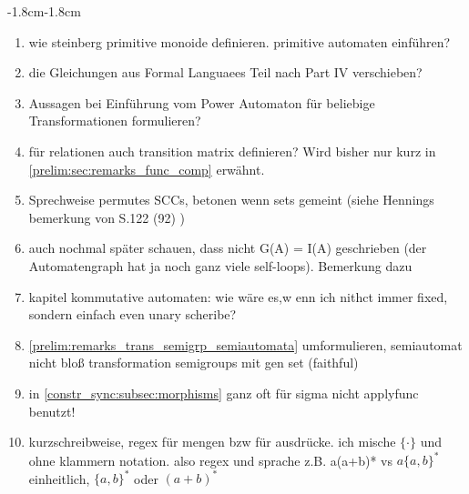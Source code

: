 \begin{adjustwidth}{-1.8cm}{-1.8cm}
\begin{enumerate}[itemsep=-5pt]
	\item wie steinberg primitive monoide definieren. primitive automaten einführen? %
		
	\item die Gleichungen aus Formal Languaees Teil nach Part IV verschieben?	
	
	\item Aussagen bei Einführung vom Power Automaton für beliebige Transformationen formulieren?
	
	\item für relationen auch transition matrix definieren? Wird bisher nur kurz in \cref{prelim:sec:remarks_func_comp} erwähnt.
		
	\item Sprechweise permutes SCCs, betonen wenn sets gemeint (siehe Hennings bemerkung von S.122 (92) )	
		
	\item auch nochmal später schauen, dass nicht G(A) = I(A) geschrieben (der Automatengraph hat ja noch ganz viele self-loops). Bemerkung dazu
	
	\item kapitel kommutative automaten: wie wäre es,w enn ich nithct immer fixed, sondern einfach even unary scheribe?
	
	
	\item \cref{prelim:remarks_trans_semigrp_semiautomata} umformulieren, semiautomat nicht bloß transformation semigroups mit gen set (faithful)
		
	
	\item in \cref{constr_sync:subsec:morphisms} ganz oft für sigma nicht applyfunc benutzt!
	
	\item kurzschreibweise, regex für mengen bzw für ausdrücke. ich mische $\{\cdot\}$ und ohne klammern notation. also regex und sprache z.B. a(a+b)* vs $a\{a,b\}^*$ einheitlich, $\{a,b\}^*$ oder $(a+b)^*$
	

\end{enumerate}
\end{adjustwidth}
